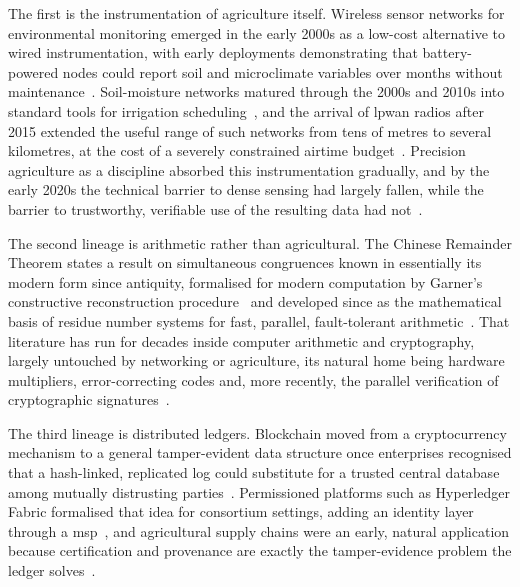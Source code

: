 The first is the instrumentation of agriculture itself. Wireless sensor
networks for environmental monitoring emerged in the early 2000s as a
low-cost alternative to wired instrumentation, with early deployments
demonstrating that battery-powered nodes could report soil and microclimate
variables over months without maintenance~\cite{wang2006wireless, pierce1999site}. Soil-moisture networks matured through the 2000s and 2010s
into standard tools for irrigation scheduling~\cite{bogena2010soil, evans2008precision}, and the arrival of \gls{lpwan} radios after 2015
extended the useful range of such networks from tens of metres to several
kilometres, at the cost of a severely constrained airtime
budget~\cite{adelantado2017understanding, raj2017comprehensive}. Precision
agriculture as a discipline absorbed this instrumentation gradually, and by
the early 2020s the technical barrier to dense sensing had largely fallen,
while the barrier to trustworthy, verifiable use of the resulting data had
not~\cite{mcbratney2005future, aydin2021comprehensive}.

The second lineage is arithmetic rather than agricultural. The Chinese
Remainder Theorem states a result on simultaneous congruences known in
essentially its modern form since antiquity, formalised for modern
computation by Garner's constructive reconstruction
procedure~\cite{garner1959residue} and developed since as the mathematical
basis of residue number systems for fast, parallel, fault-tolerant
arithmetic~\cite{ding1996remainder, parhami2010computer}. That literature
has run for decades inside computer arithmetic and cryptography, largely
untouched by networking or agriculture, its natural home being hardware
multipliers, error-correcting codes and, more recently, the parallel
verification of cryptographic
signatures~\cite{knuth1997art, hardy2008introduction, shoup2009computational}.

The third lineage is distributed ledgers. Blockchain moved from a
cryptocurrency mechanism to a general tamper-evident data structure once
enterprises recognised that a hash-linked, replicated log could substitute
for a trusted central database among mutually
distrusting parties~\cite{christidis2016blockchain, gubbi2013internet}.
Permissioned platforms such as Hyperledger Fabric formalised that idea for
consortium settings, adding an identity layer through a
\gls{msp}~\cite{jayaram2023hyperledger, hyperledger2022msp}, and agricultural
supply chains were an early, natural application because certification and
provenance are exactly the tamper-evidence problem the ledger
solves~\cite{tian2016agri, xu2016blockchain, salah2019blockchain}.

